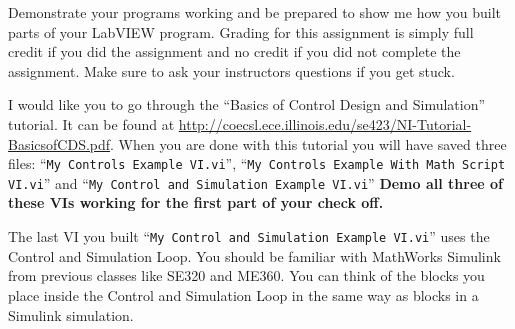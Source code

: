 \documentclass[11pt]{article}
\begin{document}
\MakeAssignmentTitle

\Ex

Demonstrate your programs working and be prepared to show me how you built parts of your LabVIEW program. Grading for this assignment is simply full credit if you did the assignment and no credit if you did not complete the assignment. Make sure to ask your instructors questions if you get stuck.

I would like you to go through the “Basics of Control Design and Simulation” tutorial. It can be found at \url{http://coecsl.ece.illinois.edu/se423/NI-Tutorial-BasicsofCDS.pdf}. When you are done with this tutorial you will have saved three files:  “\lstinline|My Controls Example VI.vi|”, “\lstinline|My Controls Example With Math Script VI.vi|” and “\lstinline|My Control and Simulation Example VI.vi|”  \textbf{Demo all three of these VIs working for the first part of your check off. }

The last VI you built “\lstinline|My Control and Simulation Example VI.vi|” uses the Control and Simulation Loop. You should be familiar with MathWorks Simulink from previous classes like SE320 and ME360. You can think of the blocks you place inside the Control and Simulation Loop in the same way as blocks in a Simulink simulation.
\end{document}
